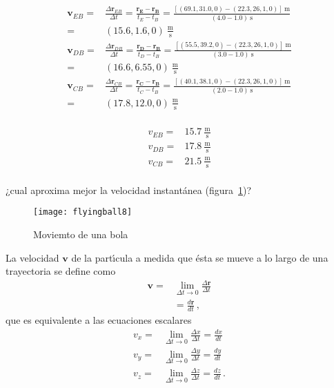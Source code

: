 \begin{align}
  \mathbf{v}_{EB}=&\frac{\Delta \mathbf{r}_{EB}}{\Delta t}
=\frac{\mathbf{\mathbf{r}_E-\mathbf{r}_B}}{t_E-t_B}=
\frac{[(69.1,31.0,0)-(22.3,26,1,0)]\ \text{m}}{(4.0-1.0)\ \text{s}}\nonumber\\
=&(15.6,1.6,0)\ \frac{\text{m}}{\text{s}}\nonumber\\
  \mathbf{v}_{DB}=&\frac{\Delta \mathbf{r}_{DB}}{\Delta t}
=\frac{\mathbf{\mathbf{r}_D-\mathbf{r}_B}}{t_D-t_B}=
\frac{[(55.5,39.2,0)-(22.3,26,1,0)]\ \text{m}}{(3.0-1.0)\ \text{s}}\nonumber\\
=&(16.6,6.55,0)\ \frac{\text{m}}{\text{s}}\nonumber\\
  \mathbf{v}_{CB}=&\frac{\Delta \mathbf{r}_{CB}}{\Delta t}
=\frac{\mathbf{\mathbf{r}_C-\mathbf{r}_B}}{t_C-t_B}=
\frac{[(40.1,38.1,0)-(22.3,26,1,0)]\ \text{m}}{(2.0-1.0)\ \text{s}}\nonumber\\
=&(17.8,12.0,0)\ \frac{\text{m}}{\text{s}}\nonumber\\
\end{align}

\begin{align}
  v_{EB}=&15.7\ \frac{\text{m}}{\text{s}}\nonumber\\
  v_{DB}=&17.8\ \frac{\text{m}}{\text{s}}\nonumber\\
  v_{CB}=&21.5\ \frac{\text{m}}{\text{s}}\nonumber\\
\end{align}

¿cual aproxima mejor la velocidad instantánea (figura~\ref{fig:flyingball8})?

\begin{figure}
  \centering
  \texttt{[image: flyingball8]}
  \caption{Moviemto de una bola}
  \label{fig:flyingball8}
\end{figure}


La velocidad $\mathbf{v}$ de la part\'\i cula a medida que \'esta se mueve a lo largo de una trayectoria se define como
\begin{align}
  \mathbf{v}=&\lim_{\Delta t\to0}\frac{\Delta\mathbf{r}}{\Delta t}\nonumber\\
  &=\frac{d\mathbf{r}}{dt}\,,
\end{align}
que es equivalente a las ecuaciones escalares
\begin{align}
  v_x=&\lim_{\Delta t\to0}\frac{\Delta x}{\Delta t}=\frac{dx}{dt}\nonumber\\
  v_y=&\lim_{\Delta t\to0}\frac{\Delta y}{\Delta t}=\frac{dy}{dt}\nonumber\\
  v_z=&\lim_{\Delta t\to0}\frac{\Delta z}{\Delta t}=\frac{dz}{dt}\,.
\end{align}

